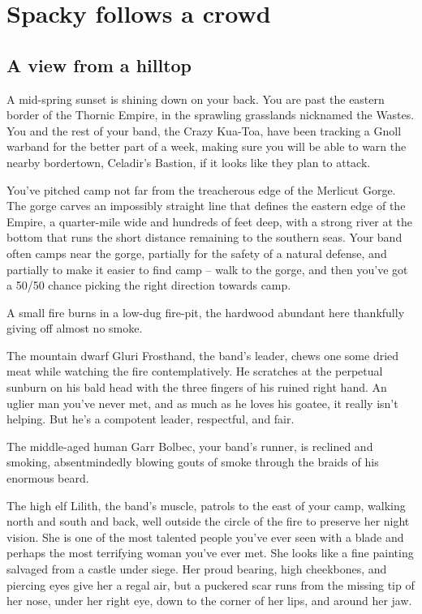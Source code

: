 \section{Spacky follows a crowd}
\begin{multicols}{2}
\subsection{A view from a hilltop}
  \begin{aloud}
  A mid-spring sunset is shining down on your back.
  You are past the eastern border of the Thornic Empire, in the sprawling grasslands
    nicknamed the Wastes.
  You and the rest of your band, the Crazy Kua-Toa, have been tracking a Gnoll warband for the
    better part of a week, making sure you will be able to warn the nearby bordertown,
    Celadir's Bastion, if it looks like they plan to attack.
  \end{aloud}

You've pitched camp not far from the treacherous edge of the Merlicut Gorge.
The gorge carves an impossibly straight line that defines the eastern edge of the Empire,
  a quarter-mile wide and hundreds of feet deep, with a strong river at the bottom that runs
  the short distance remaining to the southern seas.
Your band often camps near the gorge, partially for the safety of a natural defense, and partially
  to make it easier to find camp -- walk to the gorge, and then you've got a 50/50 chance
  picking the right direction towards camp.

A small fire burns in a low-dug fire-pit, the hardwood abundant here thankfully giving off
  almost no smoke.

The mountain dwarf Gluri Frosthand, the band's leader, chews one some dried meat while watching
  the fire contemplatively.
He scratches at the perpetual sunburn on his bald head with the three fingers of his ruined right
  hand.
An uglier man you've never met, and as much as he loves his goatee, it really isn't helping.
But he's a compotent leader, respectful, and fair.

The middle-aged human Garr Bolbec, your band's runner, is reclined and smoking, absentmindedly
  blowing gouts of smoke through the braids of his enormous beard.

The high elf Lilith, the band's muscle, patrols to the east of your camp, walking north and south
  and back, well outside the circle of the fire to preserve her night vision.
She is one of the most talented people you've ever seen with a blade and perhaps the most
  terrifying woman you've ever met.
She looks like a fine painting salvaged from a castle under siege.
Her proud bearing, high cheekbones, and piercing eyes give her a regal air, but a puckered scar
  runs from the missing tip of her nose, under her right eye, down to the corner of her lips,
  and around her jaw.


\end{multicols}
